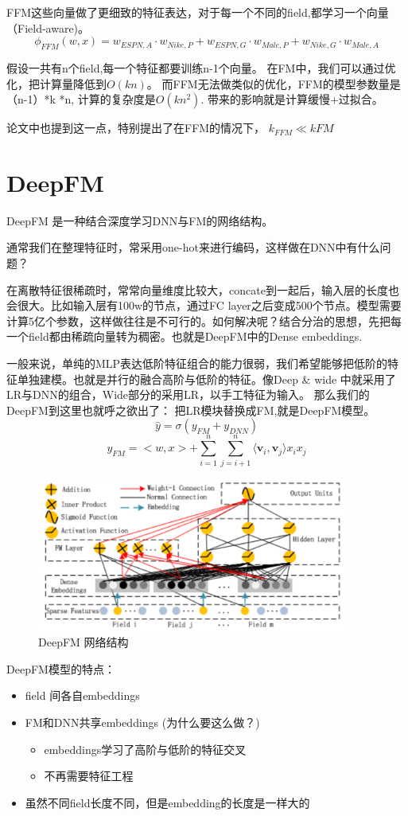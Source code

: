 \documentclass{article}
\begin{document}
\begin{CJK*}{UTF8}{gbsn}
FFM这些向量做了更细致的特征表达，对于每一个不同的field,都学习一个向量（Field-aware)。
$$\phi_{FFM}(w,x)=w_{ESPN,A}\cdot w_{Nike,P}+w_{ESPN,G}\cdot w_{Male,P}+w_{Nike,G}\cdot w_{Male,A}$$

假设一共有n个field,每一个特征都要训练n-1个向量。
在FM中，我们可以通过优化，把计算量降低到$O(kn)$。 而FFM无法做类似的优化，FFM的模型参数量是（n-1）*k *n, 计算的复杂度是$O(kn^{2})$. 带来的影响就是计算缓慢+过拟合。

论文中也提到这一点，特别提出了在FFM的情况下， $k_{FFM} \ll k{FM}$

\section{DeepFM}
DeepFM\cite{DBLP:journals/corr/GuoTYLH17} 是一种结合深度学习DNN与FM的网络结构。

通常我们在整理特征时，常采用one-hot来进行编码，这样做在DNN中有什么问题？

在离散特征很稀疏时，常常向量维度比较大，concate到一起后，输入层的长度也会很大。比如输入层有100w的节点，通过FC layer之后变成500个节点。模型需要计算5亿个参数，这样做往往是不可行的。如何解决呢？结合分治的思想，先把每一个field都由稀疏向量转为稠密。也就是DeepFM中的Dense embeddings.

一般来说，单纯的MLP表达低阶特征组合的能力很弱，我们希望能够把低阶的特征单独建模。也就是并行的融合高阶与低阶的特征。像Deep \& wide 中就采用了LR与DNN的组合，Wide部分的采用LR，以手工特征为输入。 那么我们的DeepFM到这里也就呼之欲出了： 把LR模块替换成FM,就是DeepFM模型。
$$\widehat{y}=\sigma(y_{FM}+y_{DNN})$$
$$y_{FM}=<w,x>+\sum_{i=1}^{n}\sum_{j=i+1}^{n}\langle \textbf{v}_{i} ,\textbf{v}_{j} \rangle x_{i}x_{j}$$


\begin{figure}[H]
\centering
\includegraphics[width=4in,height=2in]{deepfm}
\caption{DeepFM 网络结构}
\end{figure}

DeepFM模型的特点：
\begin{itemize}
\item field 间各自embeddings
\item FM和DNN共享embeddings (为什么要这么做？)
\begin{itemize}
\item embeddings学习了高阶与低阶的特征交叉
\item 不再需要特征工程
\end{itemize}
\item 虽然不同field长度不同，但是embedding的长度是一样大的


\end{itemize}
\end{CJK*}
\end{document}
